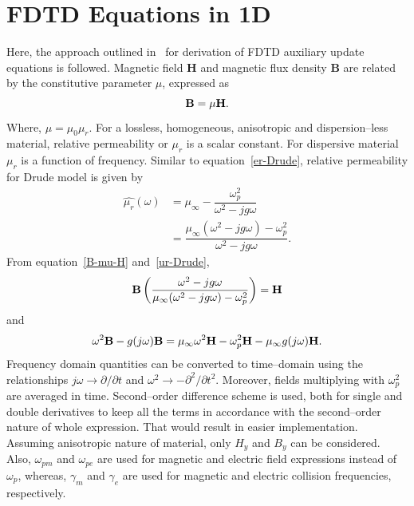 \section{FDTD Equations in 1D}
Here, the approach outlined in~\cite{Radial-Zhao} for derivation of FDTD auxiliary update equations is followed. Magnetic field $\textbf{H}$ and magnetic flux density $\textbf{B}$ are related by the constitutive parameter $\mu$, expressed as
\begin{equation}
\centering
\textbf{B} = \mu \textbf{H}.
\label{B-mu-H}
\end{equation}
Where, $\mu = \mu_0 \mu_r$. For a lossless, homogeneous, anisotropic and dispersion--less material, relative permeability or $\mu_r$ is a scalar constant. For dispersive material $\mu_r$ is a function of frequency. Similar to equation~\ref{er-Drude}, relative permeability for Drude model is given by
\begin{equation}
\begin{split}
\hat{\mu_r}(\omega)&=\mu_\infty-\dfrac{\omega^2_p}{\omega^2-jg\omega}\\
&=\dfrac{\mu_\infty(\omega^2-jg\omega)-\omega^2_p}{\omega^2-jg\omega}.
\end{split}
\label{ur-Drude}
\end{equation}
From equation~\ref{B-mu-H} and~\ref{ur-Drude},
\begin{equation}
\centering
\nonumber \textbf{B} \left( \dfrac{\omega^2-jg\omega}{\mu_\infty(\omega^2-jg\omega)-\omega^2_p} \right) =\textbf{H}
\label{B-muomega-H}
\end{equation}
and
\begin{equation}
\centering
\omega^2\textbf{B}-g(j\omega)\textbf{B} = \mu_\infty\omega^2\textbf{H}-\omega^2_p\textbf{H}-\mu_\infty g(j\omega)\textbf{H}.
\label{B-muomega-H-frequency-domain}
\end{equation}
Frequency domain quantities can be converted to time--domain using the relationships $j\omega \rightarrow \partial/\partial t$ and $\omega^2 \rightarrow - \partial^2/\partial t^2$. Moreover, fields multiplying with $\omega^2_p$ are averaged in time. Second--order difference scheme is used, both for single and double derivatives to keep all the terms in accordance with the second--order nature of whole expression. That would result in easier implementation. Assuming anisotropic nature of material, only $H_y$ and $B_y$ can be considered. Also, $\omega_{pm}$ and $\omega_{pe}$ are used for magnetic and electric field expressions instead of $\omega_p$, whereas, $\gamma_m$ and $\gamma_e$ are used for magnetic and electric collision frequencies, respectively.
